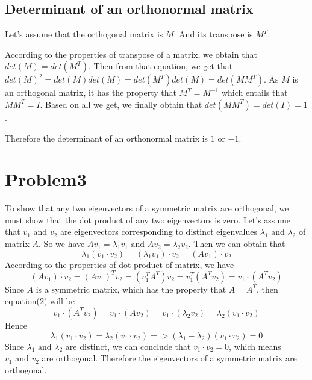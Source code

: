 \documentclass[11pt]{article}
\begin{document}
	\subsection{Determinant of an orthonormal matrix}
	\par Let's assume that the orthogonal matrix is \(M\). And its transpose is \(M^T\).
	\par According to the properties of transpose of a matrix, we obtain that \(det(M)=det(M^T)\). Then from that equation, we get that \(det(M)^2=det(M)det(M)=det(M^T)det(M)=det(MM^T)\). As \(M\) is an orthogonal matrix, it has the property that \(M^T=M^{-1}\) which entails that \(MM^T=I\). Based on all we get, we finally obtain that \(det(MM^T)=det(I)=1\).
	\par Therefore the determinant of an orthonormal matrix is \(1\mbox{ or }{-1}\).
	\section{Problem3}
	\setlength{\parindent}{2em}
	\par To show that any two eigenvectors of a symmetric matrix are orthogonal, we must show that the dot product of any two eigenvectors is zero. Let's assume that \(v_1\) and \(v_2\) are eigenvectors corresponding to distinct eigenvalues \(\lambda_1\) and \(\lambda_2\) of matrix \(A\). So we have \(Av_1 = \lambda_1v_1\mbox{ and }Av_2 = \lambda_2v_2\). Then we can obtain that \begin{equation}\lambda_1(v_1 \cdot v_2) = (\lambda_1v_1) \cdot v_2 = (Av_1) \cdot v_2\end{equation}According to the properties of dot product of matrix, we have \begin{equation}(Av_1) \cdot v_2 = (Av_1)^Tv_2 = (v_1^TA^T)v_2 = v_1^T(A^Tv_2) = v_1 \cdot (A^Tv_2)\end{equation}Since \(A\) is a symmetric matrix, which has the property that \(A = A^T\), then equation(2) will be \begin{equation}v_1 \cdot (A^Tv_2) = v_1 \cdot (Av_2) = v_1 \cdot (\lambda_2v_2) = \lambda_2(v_1 \cdot v_2)\end{equation}Hence\begin{equation}\lambda_1(v_1 \cdot v_2) = \lambda_2(v_1 \cdot v_2) => (\lambda_1 - \lambda_2)(v_1 \cdot v_2) = 0\end{equation}Since \(\lambda_1\mbox{ and }\lambda_2\) are distinct, we can conclude that \(v_1 \cdot v_2 = 0\), which means \(v_1\mbox{ and }v_2\) are orthogonal. Therefore the eigenvectors of a symmetric matrix are orthogonal.
\end{document}

